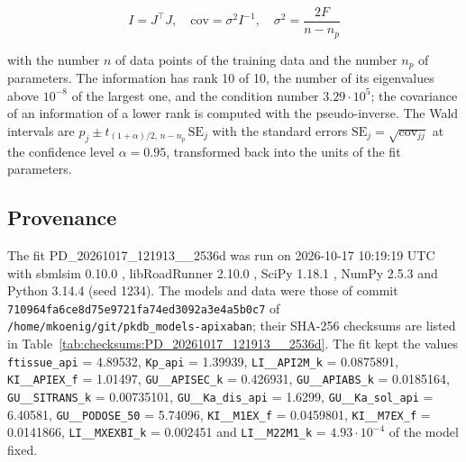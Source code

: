 \documentclass{article}
\begin{document}
\begin{equation}
I = J^\top J, \quad \mathrm{cov} = \sigma^2 I^{-1}, \quad \sigma^2 = \frac{2 F}{n - n_p}
\end{equation}

with the number $n$ of data points of the training data and the number $n_p$ of parameters. The information has rank 10 of 10, the number of its eigenvalues above $10^{-8}$ of the largest one, and the condition number $3.29 \cdot 10^{5}$; the covariance of an information of a lower rank is computed with the pseudo-inverse. The Wald intervals are $\hat{p}_j \pm t_{(1+\alpha)/2,\, n-n_p}\, \mathrm{SE}_j$ with the standard errors $\mathrm{SE}_j = \sqrt{\mathrm{cov}_{jj}}$ at the confidence level $\alpha = 0.95$, transformed back into the units of the fit parameters.

\subsection{Provenance}

The fit PD\_20261017\_121913\_\_2536d was run on 2026-10-17 10:19:19 UTC with sbmlsim 0.10.0 \cite{Koenig2026_sbmlsim}, libRoadRunner 2.10.0 \cite{Welsh2023}, SciPy 1.18.1 \cite{Virtanen2020}, NumPy 2.5.3 \cite{Harris2020} and Python 3.14.4 (seed 1234). The models and data were those of commit \texttt{710964fa6ce8d75e9721fa74ed3092a3e4a5b0c7} of \texttt{/home/mkoenig/git/pkdb\_models-apixaban}; their SHA-256 checksums are listed in Table~\ref{tab:checksums:PD_20261017_121913__2536d}. The fit kept the values \texttt{ftissue\_api} = 4.89532, \texttt{Kp\_api} = 1.39939, \texttt{LI\_\_API2M\_k} = 0.0875891, \texttt{KI\_\_APIEX\_f} = 1.01497, \texttt{GU\_\_APISEC\_k} = 0.426931, \texttt{GU\_\_APIABS\_k} = 0.0185164, \texttt{GU\_\_SITRANS\_k} = 0.00735101, \texttt{GU\_\_Ka\_dis\_api} = 1.6299, \texttt{GU\_\_Ka\_sol\_api} = 6.40581, \texttt{GU\_\_PODOSE\_50} = 5.74096, \texttt{KI\_\_M1EX\_f} = 0.0459801, \texttt{KI\_\_M7EX\_f} = 0.0141866, \texttt{LI\_\_MXEXBI\_k} = 0.002451 and \texttt{LI\_\_M22M1\_k} = $4.93 \cdot 10^{-4}$ of the model fixed.
\end{document}

